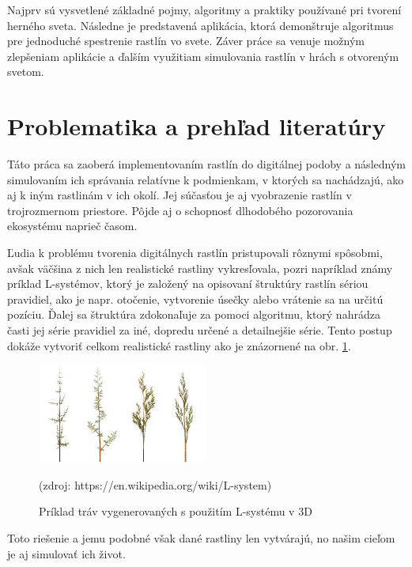 \documentclass[12pt]{article}
\begin{document}
Najprv sú vysvetlené základné pojmy, algoritmy a praktiky používané pri tvorení
herného sveta. Následne je predstavená aplikácia, ktorá demonštruje algoritmus
pre jednoduché spestrenie rastlín vo svete. Záver práce sa venuje možným
zlepšeniam aplikácie a ďalším využitiam simulovania rastlín v hrách
s otvoreným svetom.


\section{Problematika a prehľad literatúry}

Táto práca sa zaoberá implementovaním rastlín do digitálnej podoby a následným
simulovaním ich správania relatívne k podmienkam, v ktorých sa nachádzajú,
ako aj k iným rastlinám v ich okolí. Jej súčasťou je aj vyobrazenie
rastlín v trojrozmernom priestore. Pôjde aj o schopnosť dlhodobého
pozorovania ekosystému naprieč časom.

Ľudia k problému tvorenia digitálnych rastlín pristupovali rôznymi spôsobmi,
avšak väčšina z nich len realistické rastliny vykresľovala, pozri napríklad
známy príklad L-systémov, \cite{wiki:L-system}
ktorý je založený na opisovaní štruktúry rastlín
sériou pravidiel, ako je napr. otočenie, vytvorenie úsečky alebo
vrátenie sa na určitú pozíciu. Ďalej sa štruktúra zdokonaľuje za pomoci
algoritmu, ktorý nahrádza časti jej série pravidiel za iné, dopredu určené
a detailnejšie série. Tento postup dokáže vytvoriť celkom realistické rastliny
ako je znázornené na obr. \ref{obr:priklad l-systemu}.

\begin{figure}[ht]
	\centering
	\includegraphics[width=0.5\textwidth]{res/Fractal_weeds.png}
	\caption{Príklad tráv vygenerovaných s použitím L-systému v 3D}

	\footnotesize (zdroj: https://en.wikipedia.org/wiki/L-system)

	\label{obr:priklad l-systemu}
\end{figure}

Toto riešenie a jemu podobné však dané rastliny len vytvárajú, no našim cieľom
je aj simulovať ich život.
\end{document}

